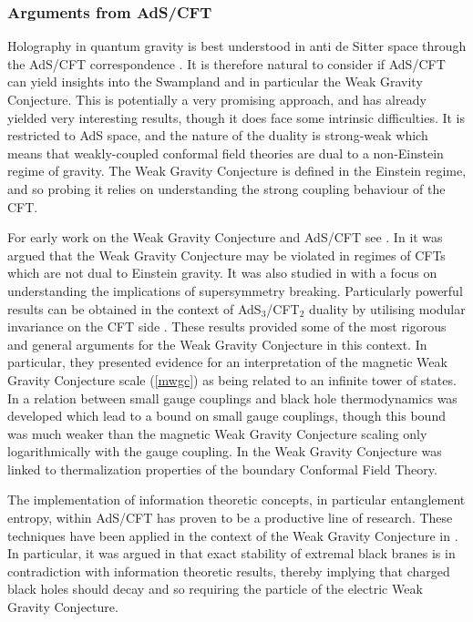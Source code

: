 \documentclass[11pt,a4paper]{article}
\numberwithin{equation}{section}
\numberwithin{table}{section}\setlength{\multlinegap}{25pt}
\begin{document}
\subsubsection{Arguments from AdS/CFT}

Holography in quantum gravity is best understood in anti de Sitter space through the AdS/CFT correspondence \cite{Maldacena:1997re}. It is therefore natural to consider if AdS/CFT can yield insights into the Swampland and in particular the Weak Gravity Conjecture. This is potentially a very promising approach, and has already yielded very interesting results, though it does face some intrinsic difficulties. It is restricted to AdS space, and the nature of the duality is strong-weak which means that weakly-coupled conformal field theories are dual to a non-Einstein regime of gravity. The Weak Gravity Conjecture is defined in the Einstein regime, and so probing it relies on understanding the strong coupling behaviour of the CFT. 

For early work on the Weak Gravity Conjecture and AdS/CFT see \cite{Hellerman:2009bu,Rattazzi:2010gj}. In \cite{Nakayama:2015hga} it was argued that the Weak Gravity Conjecture may be violated in regimes of CFTs which are not dual to Einstein gravity. It was also studied in \cite{Giombi:2017mxl} with a focus on understanding the implications of supersymmetry breaking. Particularly powerful results can be obtained in the context of AdS$_3$/CFT$_2$ duality by utilising modular invariance on the CFT side \cite{Benjamin:2016fhe,Montero:2016tif,Heidenreich:2016aqi,Bae:2018qym}. These results provided some of the most rigorous and general arguments for the Weak Gravity Conjecture in this context. In particular, they presented evidence for an interpretation of the magnetic Weak Gravity Conjecture scale (\ref{mwgc}) as being related to an infinite tower of states. In \cite{Montero:2017mdq} a relation between small gauge couplings and black hole thermodynamics was developed which lead to a bound on small gauge couplings, though this bound was much weaker than the magnetic Weak Gravity Conjecture scaling only logarithmically with the gauge coupling. In \cite{Urbano:2018kax} the Weak Gravity Conjecture was linked to thermalization properties of the boundary Conformal Field Theory. 

The implementation of information theoretic concepts, in particular entanglement entropy, within AdS/CFT has proven to be a productive line of research. These techniques have been applied in the context of the Weak Gravity Conjecture in \cite{Harlow:2015lma,Cottrell:2017ayj,Harlow:2018tng,Harlow:2018jwu,Montero:2018fns}. In particular, it was argued in \cite{Montero:2018fns} that exact stability of extremal black branes is in contradiction with information theoretic results, thereby implying that charged black holes should decay and so requiring the particle of the electric Weak Gravity Conjecture.
\end{document}
